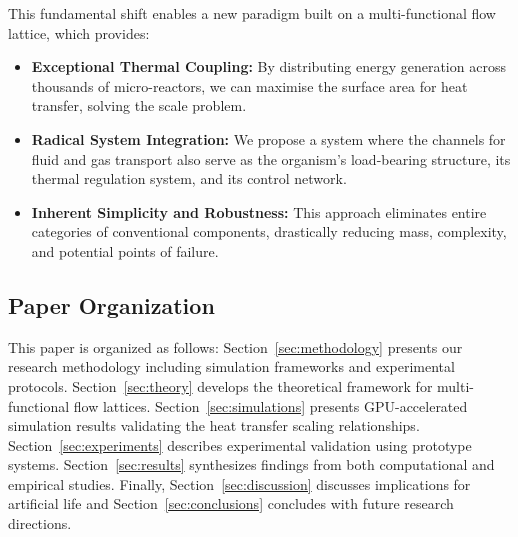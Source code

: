 This fundamental shift enables a new paradigm built on a multi-functional flow lattice, which provides:

\begin{itemize}
    \item \textbf{Exceptional Thermal Coupling:} By distributing energy generation across thousands of micro-reactors, we can maximise the surface area for heat transfer, solving the scale problem.
    
    \item \textbf{Radical System Integration:} We propose a system where the channels for fluid and gas transport also serve as the organism's load-bearing structure, its thermal regulation system, and its control network.
    
    \item \textbf{Inherent Simplicity and Robustness:} This approach eliminates entire categories of conventional components, drastically reducing mass, complexity, and potential points of failure.
\end{itemize}

\subsection{Paper Organization}

This paper is organized as follows: Section~\ref{sec:methodology} presents our research methodology including simulation frameworks and experimental protocols. Section~\ref{sec:theory} develops the theoretical framework for multi-functional flow lattices. Section~\ref{sec:simulations} presents GPU-accelerated simulation results validating the heat transfer scaling relationships. Section~\ref{sec:experiments} describes experimental validation using prototype systems. Section~\ref{sec:results} synthesizes findings from both computational and empirical studies. Finally, Section~\ref{sec:discussion} discusses implications for artificial life and Section~\ref{sec:conclusions} concludes with future research directions.